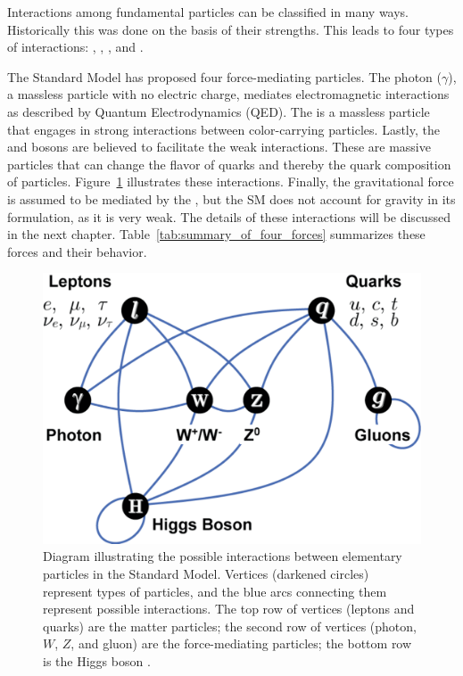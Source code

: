 Interactions among fundamental particles can be classified in many ways. Historically this was done on the basis of their strengths. This leads to four types of interactions: , , , and .

The Standard Model has proposed four force-mediating particles. The photon ($\gamma$), a massless particle with no electric charge, mediates electromagnetic interactions as described by Quantum Electrodynamics (QED). The  is a massless particle that engages in strong interactions between color-carrying particles. Lastly, the \W and \Z bosons are believed to facilitate the weak interactions.  These are massive particles that can change the flavor of quarks and thereby the quark composition of particles.  Figure~\ref{fig:SMinteractions} illustrates these interactions. Finally, the gravitational force is assumed to be mediated by the , but the SM does not account for gravity in its formulation, as it is very weak. The details of these interactions will be discussed in the next chapter. Table~\ref{tab:summary_of_four_forces} summarizes these forces and their behavior.

\begin{figure}[htb!]
\centering
\includegraphics[scale=0.35]{Interactions.pdf}
\caption[Standard Model particles and force interactions.]{Diagram illustrating the possible interactions between elementary particles in the Standard Model. Vertices (darkened circles) represent types of particles, and the blue arcs connecting them represent possible interactions. The top row of vertices (leptons and quarks) are the matter particles; the second row of vertices (photon, $W$, $Z$, and gluon) are the force-mediating particles; the bottom row is the Higgs boson \cite{img_Interactions}.
\label{fig:SMinteractions}}
\end{figure}

